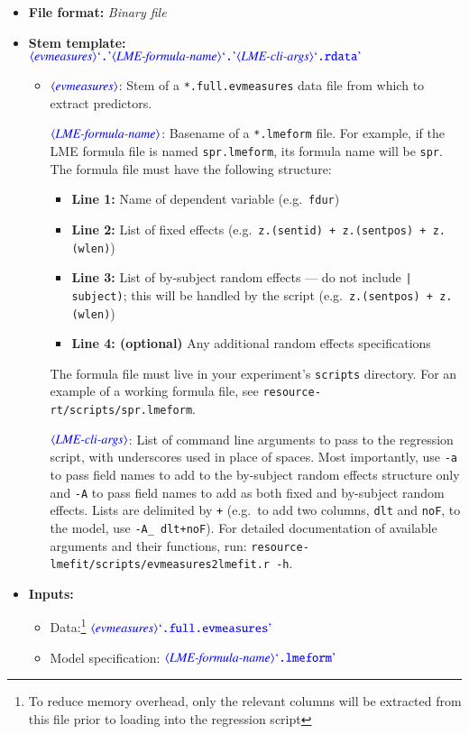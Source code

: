 \documentclass[12pt]{report}
\def\blue{\color{blue}}
\begin{document}
\begin{itemize}
\item\textbf{File format:} \textit{Binary file}
\item\textbf{Stem template:}\\
$\dtype{evmeasures} \dcode{.} \dtype{LME-formula-name} \dcode{.} \dtype{LME-cli-args} \dcode{.rdata}$

\begin{itemize}
\item
$\dtype{evmeasures}$: Stem of a {\tt\blue *.full.evmeasures} data file from which to extract predictors.

$\dtype{LME-formula-name}$: Basename of a {\tt\blue *.lmeform} file.
For example, if the LME formula file is named {\tt\blue spr.lmeform}, its formula name will be {\tt\blue spr}.
The formula file must have the following structure:
\begin{itemize}
\item \textbf{Line 1:} Name of dependent variable (e.g.\ {\tt\blue fdur})
\item \textbf{Line 2:} List of fixed effects (e.g.\ {\tt\blue z.(sentid) + z.(sentpos) + z.(wlen)})
\item \textbf{Line 3:} List of by-subject random effects --- do not include {\tt\blue | subject)}; this will be handled by the script (e.g.\ {\tt\blue z.(sentpos) + z.(wlen)})
\item \textbf{Line 4: (optional)} Any additional random effects specifications
\end{itemize}
The formula file must live in your experiment's {\tt\blue scripts} directory.
For an example of a working formula file, see {\tt\blue resource-rt/scripts/spr.lmeform}.

$\dtype{LME-cli-args}$: List of command line arguments to pass to the regression script, with underscores used in place of spaces.
Most importantly, use {\tt\blue -a} to pass field names to add to the by-subject random effects structure only and {\tt\blue -A} to pass field names to add as both fixed and by-subject random effects.
Lists are delimited by {\tt\blue +} (e.g.\ to add two columns, {\tt\blue dlt} and {\tt\blue noF}, to the model, use {\tt\blue -A\_ dlt+noF}).
For detailed documentation of available arguments and their functions, run: {\tt\blue resource-lmefit/scripts/evmeasures2lmefit.r -h}.
\end{itemize}
\item\textbf{Inputs:}
\begin{itemize}
\item Data:\footnote{To reduce memory overhead, only the relevant columns will be extracted from this file prior to loading into the regression script} $\dtype{evmeasures} \dcode{.full.evmeasures}$
\item Model specification: $\dtype{LME-formula-name} \dcode{.lmeform}$ 
\end{itemize}
\end{itemize}
\end{document}
